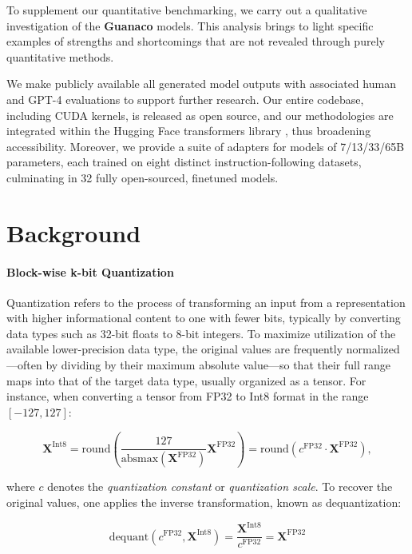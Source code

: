 To supplement our quantitative benchmarking, we carry out a qualitative investigation of the \textbf{Guanaco} models. This analysis brings to light specific examples of strengths and shortcomings that are not revealed through purely quantitative methods.

We make publicly available all generated model outputs with associated human and GPT-4 evaluations to support further research. Our entire codebase, including CUDA kernels, is released as open source, and our methodologies are integrated within the Hugging Face transformers library \citep{wolf2019huggingface}, thus broadening accessibility. Moreover, we provide a suite of adapters for models of 7/13/33/65B parameters, each trained on eight distinct instruction-following datasets, culminating in 32 fully open-sourced, finetuned models.

\section{Background}
\paragraph{Block-wise k-bit Quantization} Quantization refers to the process of transforming an input from a representation with higher informational content to one with fewer bits, typically by converting data types such as 32-bit floats to 8-bit integers. To maximize utilization of the available lower-precision data type, the original values are frequently normalized—often by dividing by their maximum absolute value—so that their full range maps into that of the target data type, usually organized as a tensor. For instance, when converting a tensor from FP32 to Int8 format in the range $[-127, 127]$:

\begin{equation}
    \mathbf{X}^{ \text{Int8}} = \text{round}\left( \frac{127}{{\text{absmax}}(\mathbf{X}^{{\text{FP32}}})}\mathbf{X}^{{\text{FP32}}} \right) = \text{round}(c^{\text{FP32}}\cdot \mathbf{X}^{{\text{FP32}}}),
\end{equation}

where $c$ denotes the {\em quantization constant} or {\em quantization scale}. To recover the original values, one applies the inverse transformation, known as dequantization:

\begin{equation}
    \text{dequant}(c^{\text{FP32}}, \mathbf{X}^{\text{Int8}}) = \frac{\mathbf{X}^{\text{Int8}}}{c^{\text{FP32}}} = \mathbf{X}^{\text{FP32}}
\end{equation}

